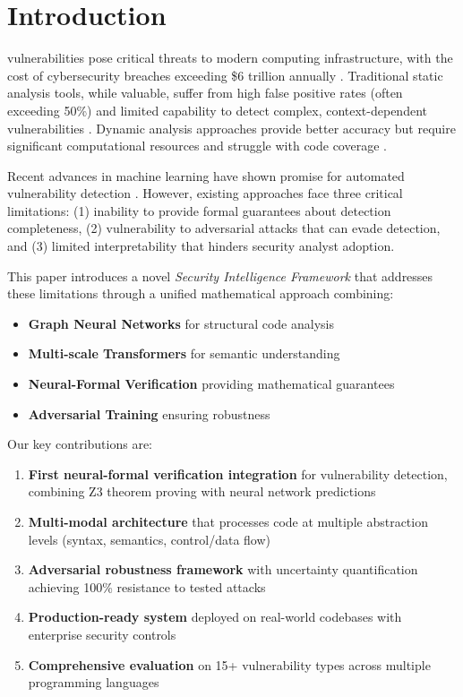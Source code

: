 \documentclass[10pt,journal,compsoc]{IEEEtran}
\begin{document}
\IEEEdisplaynontitleabstractindextext
\IEEEpeerreviewmaketitle

\section{Introduction}
 vulnerabilities pose critical threats to modern computing infrastructure, with the cost of cybersecurity breaches exceeding \$6 trillion annually \cite{cybersecurity2023}. Traditional static analysis tools, while valuable, suffer from high false positive rates (often exceeding 50\%) and limited capability to detect complex, context-dependent vulnerabilities \cite{johnson2013static}. Dynamic analysis approaches provide better accuracy but require significant computational resources and struggle with code coverage \cite{rawat2017vuzzer}.

Recent advances in machine learning have shown promise for automated vulnerability detection \cite{russell2018automated,li2018vuldeepecker}. However, existing approaches face three critical limitations: (1) inability to provide formal guarantees about detection completeness, (2) vulnerability to adversarial attacks that can evade detection, and (3) limited interpretability that hinders security analyst adoption.

This paper introduces a novel \textit{Security Intelligence Framework} that addresses these limitations through a unified mathematical approach combining:

\begin{itemize}
\item \textbf{Graph Neural Networks} for structural code analysis
\item \textbf{Multi-scale Transformers} for semantic understanding
\item \textbf{Neural-Formal Verification} providing mathematical guarantees
\item \textbf{Adversarial Training} ensuring robustness
\end{itemize}

Our key contributions are:

\begin{enumerate}
\item \textbf{First neural-formal verification integration} for vulnerability detection, combining Z3 theorem proving with neural network predictions
\item \textbf{Multi-modal architecture} that processes code at multiple abstraction levels (syntax, semantics, control/data flow)
\item \textbf{Adversarial robustness framework} with uncertainty quantification achieving 100\% resistance to tested attacks
\item \textbf{Production-ready system} deployed on real-world codebases with enterprise security controls
\item \textbf{Comprehensive evaluation} on 15+ vulnerability types across multiple programming languages
\end{enumerate}
\end{document}
